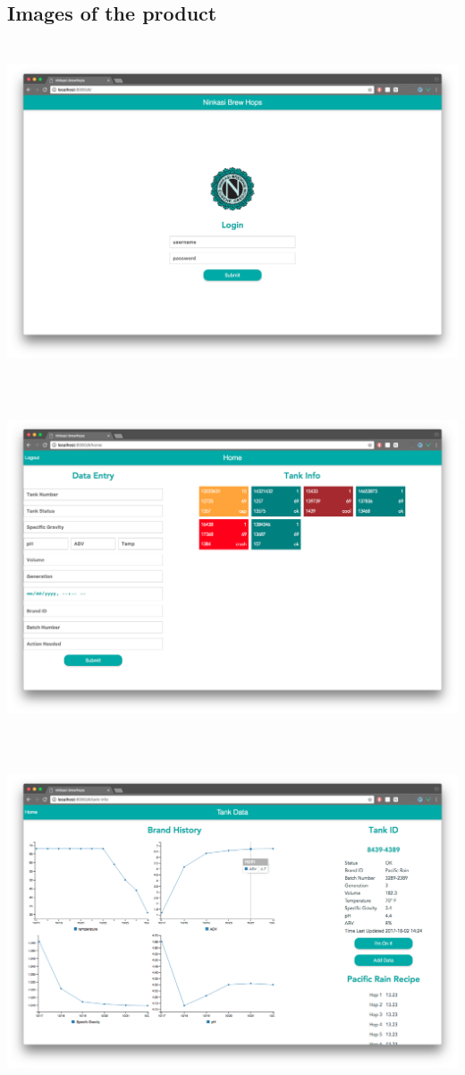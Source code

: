 \documentclass[draftclsnofoot,onecolumn,letterpaper,10pt,compsoc]{IEEEtran}
\begin{document}
\subsection{Images of the product}
\centerline{\includegraphics[height=10cm]{screenshots/desktop/login.png}}
\centerline{\includegraphics[height=10cm]{screenshots/desktop/home.png}}
\centerline{\includegraphics[height=10cm]{screenshots/desktop/tank_info.png}}
\end{document}

